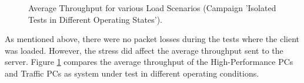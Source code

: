 \begin{figure}[htbp]
  \centering
  \caption{Average Throughput for various Load Scenarios (Campaign 'Isolated Tests in Different Operating States').}
  \label{fig:resuc2}
\end{figure}

As mentioned above, there were no packet losses during the tests where the client was loaded. However, the stress did affect the average throughput sent to the server. Figure \ref{fig:resuc2} compares the average throughput of the High-Performance PCs and Traffic PCs as system under test in different operating conditions.

